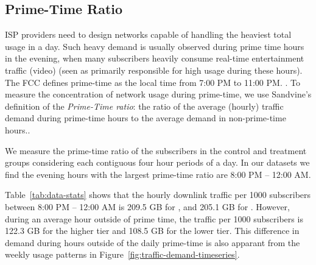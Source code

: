 \subsection{Prime-Time Ratio} \label{subsec:primetime}

ISP providers need to design networks capable of handling the heaviest total usage
in a day. Such heavy demand is usually observed during prime time hours in the 
evening, when many subscribers heavily consume real-time entertainment traffic
(video) (seen as primarily responsible for high usage during these hours).
The FCC defines prime-time as the local time from 7:00 PM to 11:00 PM.
\cite{fcc2014measuring-broadband}. To measure the concentration of network usage
during prime-time, we use Sandvine's definition of the \emph{Prime-Time 
ratio}: the ratio of the average (hourly) traffic demand during prime-time hours to the average 
demand in non-prime-time hours.\cite{sandvine20141h, sandvine20142h}.

We measure the prime-time ratio of the subscribers in the control and treatment groups
considering each contiguous four hour periods of a day. In our datasets we find the
evening hours with the largest prime-time ratio are 8:00 PM -- 12:00 AM.





Table~\ref{tab:data-stats} shows that the hourly downlink traffic per 1000 subscribers between 8:00 PM -- 12:00 AM is 
209.5 GB for \treatment{}, and 205.1 GB for \control{}. However, during an average hour
outside of prime time, the traffic per 1000 subscribers is 122.3 GB for the higher tier
and 108.5 GB for the lower tier. This difference in demand during hours outside of the
daily prime-time is also apparant from the weekly usage patterns in Figure~\ref{fig:traffic-demand-timeseries}.

